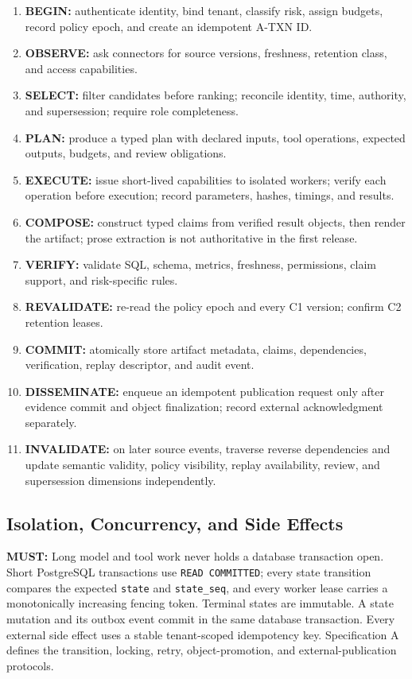 \documentclass[10pt]{article}
\newcommand{\code}[1]{\texttt{#1}}
\newcommand{\atxn}{\textsc{A-TXN}\xspace}
\newcommand{\must}{\textbf{\textcolor{amosblue}{MUST:}}\xspace}
\begin{document}
\begin{enumerate}
  \item \textbf{BEGIN:} authenticate identity, bind tenant, classify risk, assign budgets, record policy epoch, and create an idempotent \atxn ID.
  \item \textbf{OBSERVE:} ask connectors for source versions, freshness, retention class, and access capabilities.
  \item \textbf{SELECT:} filter candidates before ranking; reconcile identity, time, authority, and supersession; require role completeness.
  \item \textbf{PLAN:} produce a typed plan with declared inputs, tool operations, expected outputs, budgets, and review obligations.
  \item \textbf{EXECUTE:} issue short-lived capabilities to isolated workers; verify each operation before execution; record parameters, hashes, timings, and results.
  \item \textbf{COMPOSE:} construct typed claims from verified result objects, then render the artifact; prose extraction is not authoritative in the first release.
  \item \textbf{VERIFY:} validate SQL, schema, metrics, freshness, permissions, claim support, and risk-specific rules.
  \item \textbf{REVALIDATE:} re-read the policy epoch and every C1 version; confirm C2 retention leases.
  \item \textbf{COMMIT:} atomically store artifact metadata, claims, dependencies, verification, replay descriptor, and audit event.
  \item \textbf{DISSEMINATE:} enqueue an idempotent publication request only after evidence commit and object finalization; record external acknowledgment separately.
  \item \textbf{INVALIDATE:} on later source events, traverse reverse dependencies and update semantic validity, policy visibility, replay availability, review, and supersession dimensions independently.
\end{enumerate}

\subsection{Isolation, Concurrency, and Side Effects}

\must Long model and tool work never holds a database transaction open. Short PostgreSQL transactions use \code{READ COMMITTED}; every state transition compares the expected \code{state} and \code{state\_seq}, and every worker lease carries a monotonically increasing fencing token. Terminal states are immutable. A state mutation and its outbox event commit in the same database transaction. Every external side effect uses a stable tenant-scoped idempotency key. Specification A defines the transition, locking, retry, object-promotion, and external-publication protocols.
\end{document}
